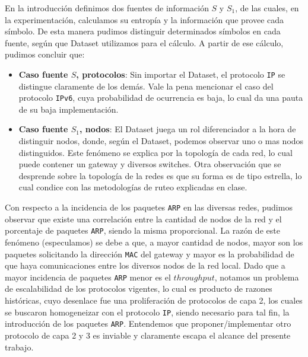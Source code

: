 En la introducción definimos dos fuentes de información $S$ y $S_{1}$, de las cuales, en la experimentación, calculamos su entropía y la información que provee cada símbolo. De esta manera pudimos distinguir determinados símbolos en cada fuente, según que Dataset utilizamos para el cálculo. A partir de ese cálculo, pudimos concluir que:
\begin{itemize}
  \item \textbf{Caso fuente $S$, protocolos}: Sin importar el Dataset, el protocolo \texttt{IP} se distingue claramente de los demás. Vale la pena mencionar el caso del protocolo \texttt{IPv6}, cuya probabilidad de ocurrencia es baja, lo cual da una pauta de su baja implementación.
  \item \textbf{Caso fuente $S_{1}$, nodos}: El Dataset juega un rol diferenciador a la hora de distinguir nodos, donde, según el Dataset, podemos observar uno o mas nodos distinguidos. Este fenómeno se explica por la topología de cada red, lo cual puede contener un gateway y diversos switches.
  Otra observación que se desprende sobre la topología de la redes es que su forma es de tipo estrella, lo cual condice con las metodologías de ruteo explicadas en clase.
\end{itemize}

Con respecto a la incidencia de los paquetes \texttt{ARP} en las diversas redes, pudimos observar que existe una correlación entre la cantidad de nodos de la red y el porcentaje de paquetes \texttt{ARP}, siendo la misma proporcional. La razón de este fenómeno (especulamos) se debe a que, a mayor cantidad de nodos, mayor son los paquetes solicitando la dirección \texttt{MAC} del gateway y mayor es la probabilidad de que haya comunicaciones entre los diversos nodos de la red local. Dado que a mayor incidencia de paquetes \texttt{ARP} menor es el $throughput$, notamos un problema de escalabilidad de los protocolos vigentes, lo cual es producto de razones históricas, cuyo desenlace fue una proliferación de protocolos de capa 2, los cuales se buscaron homogeneizar con el protocolo \texttt{IP}, siendo necesario para tal fin, la introducción de los paquetes \texttt{ARP}. Entendemos que proponer/implementar otro protocolo de capa 2 y 3 es inviable y claramente escapa el alcance del presente trabajo.

